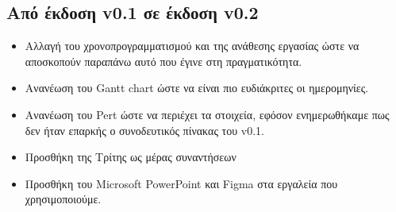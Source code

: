 \documentclass[12pt,a4paper]{article}
\begin{document}
\subsection{Από έκδοση v0.1 σε έκδοση v0.2}
\begin{itemize}
    \item Αλλαγή του χρονοπρογραμματισμού και της ανάθεσης εργασίας ώστε να αποσκοπούν παραπάνω αυτό που έγινε στη πραγματικότητα.
    \item Ανανέωση του Gantt chart ώστε να είναι πιο ευδιάκριτες οι ημερομηνίες.
    \item Ανανέωση του Pert ώστε να περιέχει τα στοιχεία, εφόσον ενημερωθήκαμε πως δεν ήταν επαρκής ο συνοδευτικός πίνακας του v0.1.
    \item Προσθήκη της Τρίτης ως μέρας συναντήσεων
    \item Προσθήκη του Microsoft PowerPoint και Figma στα εργαλεία που χρησιμοποιούμε.
\end{itemize}
\end{document}
